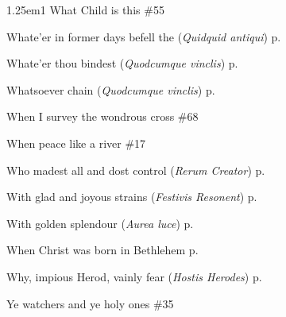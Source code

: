 \begin{hangparas}{1.25em}{1}
What Child is this \dotfill \#55
\par\noindent
Whate'er in former days befell the (\textit{Quidquid antiqui}) \dotfill p. \pageref{BenedictInvitatory}
\par\noindent
Whate'er thou bindest (\textit{Quodcumque vinclis}) \dotfill p. \pageref{LammasInvitatory}
\par\noindent
Whatsoever chain (\textit{Quodcumque vinclis}) \dotfill p. \pageref{PeterAntiochEvensong}
\par\noindent
When I survey the wondrous cross \dotfill \#68
\par\noindent
When peace like a river \dotfill \#17
\par\noindent
Who madest all and dost control (\textit{Rerum Creator}) \dotfill p. \pageref{WednesdayInvitatory}
\par\noindent
With glad and joyous strains (\textit{Festivis Resonent}) \dotfill p. \pageref{PreciousBloodEvensong}
\par\noindent
With golden splendour (\textit{Aurea luce}) \dotfill p. \pageref{PeterEvensong}
\par\noindent
When Christ was born in Bethlehem \dotfill p. \pageref{WalsinghamMattins}
\par\noindent
Why, impious Herod, vainly fear (\textit{Hostis Herodes}) \dotfill p. \pageref{EpiphanyEvensongHymn}
\par\noindent
Ye watchers and ye holy ones \dotfill \#35
\end{hangparas}

\normalsize

